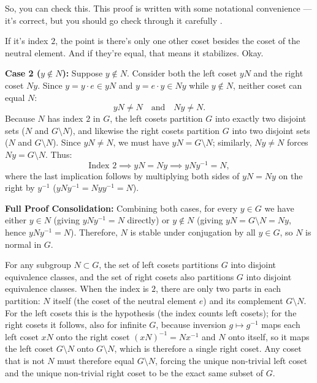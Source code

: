 \begin{proofWrapper}
\begin{speech}[00:12:01 - 00:13:20]
So, you can check this. This proof is written with some notational convenience --- it's correct, but you should go check through it carefully .

If it's index $2$, the point is there's only one other coset besides the coset of the neutral element. And if they're equal, that means it stabilizes. Okay.
\end{speech}

\begin{content}
\textbf{Case 2 ($y \notin N$):} Suppose $y \notin N$. Consider both the left coset $yN$ and the right coset $Ny$. Since $y = y \cdot e \in yN$ and $y = e \cdot y \in Ny$ while $y \notin N$, neither coset can equal $N$:
\[
yN \neq N \quad \text{and} \quad Ny \neq N.
\]
Because $N$ has index $2$ in $G$, the left cosets partition $G$ into exactly two disjoint sets ($N$ and $G \setminus N$), and likewise the right cosets partition $G$ into two disjoint sets ($N$ and $G \setminus N$). Since $yN \neq N$, we must have $yN = G \setminus N$; similarly, $Ny \neq N$ forces $Ny = G \setminus N$. Thus:
\[
\text{Index } 2 \implies yN = Ny \implies y N y^{-1} = N,
\]
where the last implication follows by multiplying both sides of $yN = Ny$ on the right by $y^{-1}$ ($y N y^{-1} = N y y^{-1} = N$).

\textbf{Full Proof Consolidation:} Combining both cases, for every $y \in G$ we have either $y \in N$ (giving $y N y^{-1} = N$ directly) or $y \notin N$ (giving $yN = G \setminus N = Ny$, hence $y N y^{-1} = N$). Therefore, $N$ is stable under conjugation by all $y \in G$, so $N$ is normal in $G$.

\begin{steps}[Why the Index-$2$ Partition Forces $yN = Ny$]
For any subgroup $N \subset G$, the set of left cosets partitions $G$ into disjoint equivalence classes, and the set of right cosets also partitions $G$ into disjoint equivalence classes. When the index is $2$, there are only two parts in each partition: $N$ itself (the coset of the neutral element $e$) and its complement $G \setminus N$. For the left cosets this is the hypothesis (the index counts left cosets); for the right cosets it follows, also for infinite $G$, because inversion $g \mapsto g^{-1}$ maps each left coset $x N$ onto the right coset $(x N)^{-1} = N x^{-1}$ and $N$ onto itself, so it maps the left coset $G \setminus N$ onto $G \setminus N$, which is therefore a single right coset. Any coset that is not $N$ must therefore equal $G \setminus N$, forcing the unique non-trivial left coset and the unique non-trivial right coset to be the exact same subset of $G$.
\end{steps}
\end{content}


\end{proofWrapper}
